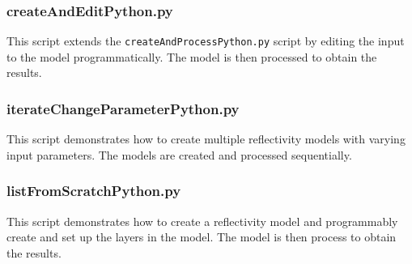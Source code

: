 

\subsubsection{createAndEditPython.py} 

This script extends the
\texttt{createAndProcessPython.py} script by editing the input to the model
programmatically. The model is then processed to obtain the results.



\subsubsection{iterateChangeParameterPython.py} 
This script demonstrates how to create
multiple reflectivity models with varying input parameters. The models are created
and processed sequentially.



\subsubsection{listFromScratchPython.py} 
This script demonstrates how to create a
reflectivity model and programmably create and set up the layers in the model.
The model is then process to obtain the results.


